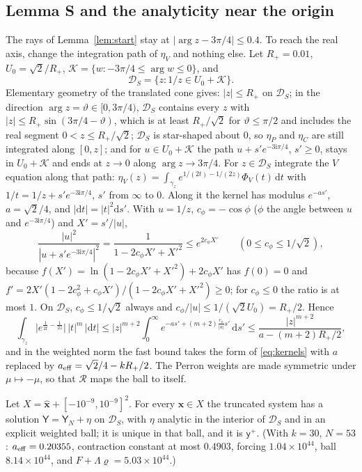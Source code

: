 \documentclass{amsart}
\numberwithin{equation}{section}
\theoremstyle{plain}
\newenvironment{lemnamed}[1]{\renewcommand\theinnerlem{#1}\innerlem}{\endinnerlem}
\theoremstyle{definition}
\theoremstyle{remark}
\newcommand{\bx}{\mathbf{x}}
\newcommand{\hx}{\hat{\mathbf{x}}}
\newcommand{\iu}{\mathrm{i}}
\newcommand{\dd}{\mathrm{d}}
\begin{document}
\subsection{Lemma S and the analyticity near the origin}
The rays of Lemma~\ref{lem:start} stay at $|\arg z - 3\pi/4| \le 0.4$. To reach the real axis, change the integration path of
$\eta_V$ and nothing else. Let $R_+ = 0.01$, $U_0 = \sqrt2/R_+$, $\mathcal K = \{w : -3\pi/4 \le \arg w \le 0\}$, and
\[
\mathcal D_S = \{z : 1/z \in U_0 + \mathcal K\}.
\]
Elementary geometry of the translated cone gives: $|z| \le R_+$ on $\mathcal D_S$; in the direction $\arg z = \vartheta \in [0, 3\pi/4)$,
$\mathcal D_S$ contains every $z$ with $|z| \le R_+\sin(3\pi/4 - \vartheta)$, which is at least $R_+/\sqrt2$ for $\vartheta \le \pi/2$ and
includes the real segment $0 < z \le R_+/\sqrt2$; $\mathcal D_S$ is star-shaped about $0$, so $\eta_P$ and $\eta_C$ are still
integrated along $[0, z]$; and for $u \in U_0 + \mathcal K$ the path $u + s'e^{-3\iu\pi/4}$, $s' \ge 0$, stays in $U_0 + \mathcal K$ and
ends at $z \to 0$ along $\arg z \to 3\pi/4$. For $z \in \mathcal D_S$ integrate the $V$ equation along that path:
$\eta_V(z) = \int_{\gamma_z}e^{1/(2t) - 1/(2z)}\Phi_V(t)\,\dd t$ with $1/t = 1/z + s'e^{-3\iu\pi/4}$, $s'$ from $\infty$ to $0$. Along it
the kernel has modulus $e^{-as'}$, $a = \sqrt2/4$, and $|\dd t| = |t|^2\dd s'$. With $u = 1/z$, $c_\phi = -\cos\phi$ ($\phi$ the angle
between $u$ and $e^{-3\iu\pi/4}$) and $X' = s'/|u|$,
\[
\frac{|u|^2}{|u + s'e^{-3\iu\pi/4}|^2} = \frac{1}{1 - 2c_\phi X' + X'^2} \le e^{2c_\phi X'}\qquad (0 \le c_\phi \le 1/\sqrt2),
\]
because $f(X') = \ln(1 - 2c_\phi X' + X'^2) + 2c_\phi X'$ has $f(0) = 0$ and $f' = 2X'(1 - 2c_\phi^2 + c_\phi X')/(1 - 2c_\phi X' + X'^2) \ge 0$;
for $c_\phi \le 0$ the ratio is at most $1$. On $\mathcal D_S$, $c_\phi \le 1/\sqrt2$ always and $c_\phi/|u| \le 1/(\sqrt2U_0) = R_+/2$. Hence
\[
\int_{\gamma_z}\Big|e^{\frac1{2t} - \frac1{2z}}\Big|\,|t|^m\,|\dd t| \le |z|^{m+2}\int_0^\infty e^{-as' + (m+2)\frac{c_\phi}{|u|}s'}\,\dd s'
\le \frac{|z|^{m+2}}{a - (m+2)R_+/2},
\]
and in the weighted norm the fast bound takes the form of \eqref{eq:kernels} with $a$ replaced by
$a_{\rm eff} = \sqrt2/4 - kR_+/2$. The Perron weights are made symmetric under $\mu \mapsto -\mu$, so that $\mathcal R$ maps the ball to
itself.

\begin{lemnamed}{S}\label{lem:S}
Let $X = \hx + [-10^{-9}, 10^{-9}]^2$. For every $\bx \in X$ the truncated system has a solution $\mathsf Y = \mathsf Y_N + \eta$ on
$\mathcal D_S$, with $\eta$ analytic in the interior of $\mathcal D_S$ and in an explicit weighted ball; it is unique in that ball, and it
is $\mathsf y^+$. (With $k = 30$, $N = 53$: $a_{\rm eff} = 0.20355$, contraction constant at most $0.4903$, forcing $1.04\times10^{44}$,
ball $8.14\times10^{44}$, and $F + \Lambda\varrho = 5.03\times10^{44}$.)
\end{lemnamed}
\end{document}
